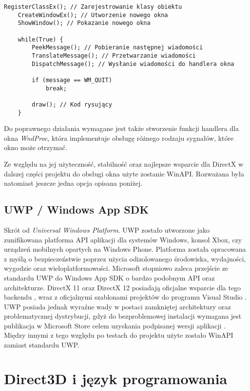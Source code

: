 \begin{lstlisting}[caption={Pseudokod inicjalizacji okna WinAPI (oryginalna treść)}, label={lst:winapi:init}]
	RegisterClassEx(); // Zarejestrowanie klasy obiektu
	CreateWindowEx(); // Utworzenie nowego okna
	ShowWindow(); // Pokazanie nowego okna
	
	while(True) {
		PeekMessage(); // Pobieranie następnej wiadomości
		TranslateMessage(); // Przetwarzanie wiadomości
		DispatchMessage(); // Wysłanie wiadomości do handlera okna
	
		if (message == WM_QUIT)
			break;
		
		draw(); // Kod rysujący
	}
\end{lstlisting}

Do poprawnego działania wymagane jest także stworzenie funkcji handlera
dla okna \emph{WndProc}, która implementuje obsługę różnego rodzaju
sygnałów, które okno może otrzymać. 

Ze względu na jej użyteczność, stabilność oraz najlepsze wsparcie dla
DirectX w dalszej części projektu do obsługi okna użyte zostanie WinAPI. Rozważana była natomiast jeszcze jedna opcja opisana poniżej.

\subsection{UWP / Windows App SDK}

Skrót od \emph{Universal Windows Platform}. UWP zostało utworzone jako
zunifikowana platforma API aplikacji dla systemów Windows, konsol Xbox,
czy urządzeń mobilnych opartych na Windows Phone. Platforma została
opracowana z myślą o bezpieczeństwie poprzez użycia odizolowanego
środowiska, wydajności, wygodzie oraz wieloplatformowości. Microsoft
stopniowo zaleca przejście ze standardu UWP do Windows App SDK o bardzo
podobnym API oraz architekturze. DirectX 11 oraz DirectX 12 posiadają oficjalne wsparcie dla tego
backendu \cite{ms:dxuwp:2024}, wraz z oficjalnymi szablonami projektów do programu
Visual Studio \cite{ms:dxuwpui:2024}. UWP posiada jednak wyraźne wady w postaci zamkniętej architektury oraz
problematycznej dystrybucji, gdyż do bezproblemowej instalacji wymagana
jest publikacja w Microsoft Store celem uzyskania podpisanej wersji
aplikacji \cite{ms:uwppackaging:2024}. Między innymi z tego względu po testach do projektu użyte zostało WinAPI
zamiast standardu UWP.

\section{Direct3D i język programowania}

